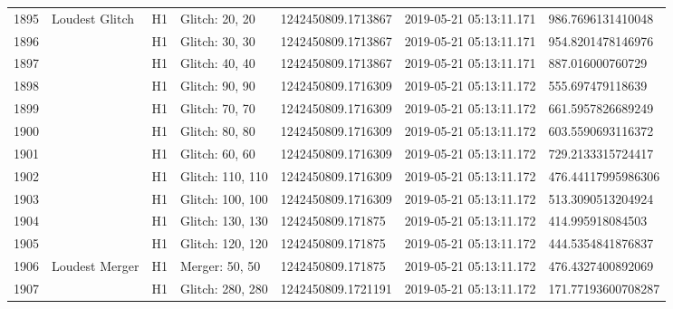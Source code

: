 \begin{longtable}{lllllll}
1895 &                                     Loudest Glitch &       H1 &    Glitch: 20, 20 &  1242450809.1713867 &  2019-05-21 05:13:11.171 &   986.7696131410048 \\
1896 &                                                    &       H1 &    Glitch: 30, 30 &  1242450809.1713867 &  2019-05-21 05:13:11.171 &   954.8201478146976 \\
1897 &                                                    &       H1 &    Glitch: 40, 40 &  1242450809.1713867 &  2019-05-21 05:13:11.171 &    887.016000760729 \\
1898 &                                                    &       H1 &    Glitch: 90, 90 &  1242450809.1716309 &  2019-05-21 05:13:11.172 &    555.697479118639 \\
1899 &                                                    &       H1 &    Glitch: 70, 70 &  1242450809.1716309 &  2019-05-21 05:13:11.172 &   661.5957826689249 \\
1900 &                                                    &       H1 &    Glitch: 80, 80 &  1242450809.1716309 &  2019-05-21 05:13:11.172 &   603.5590693116372 \\
1901 &                                                    &       H1 &    Glitch: 60, 60 &  1242450809.1716309 &  2019-05-21 05:13:11.172 &   729.2133315724417 \\
1902 &                                                    &       H1 &  Glitch: 110, 110 &  1242450809.1716309 &  2019-05-21 05:13:11.172 &  476.44117995986306 \\
1903 &                                                    &       H1 &  Glitch: 100, 100 &  1242450809.1716309 &  2019-05-21 05:13:11.172 &   513.3090513204924 \\
1904 &                                                    &       H1 &  Glitch: 130, 130 &   1242450809.171875 &  2019-05-21 05:13:11.172 &    414.995918084503 \\
1905 &                                                    &       H1 &  Glitch: 120, 120 &   1242450809.171875 &  2019-05-21 05:13:11.172 &   444.5354841876837 \\
1906 &                                     Loudest Merger &       H1 &    Merger: 50, 50 &   1242450809.171875 &  2019-05-21 05:13:11.172 &   476.4327400892069 \\
1907 &                                                    &       H1 &  Glitch: 280, 280 &  1242450809.1721191 &  2019-05-21 05:13:11.172 &  171.77193600708287 \\

\end{longtable}
